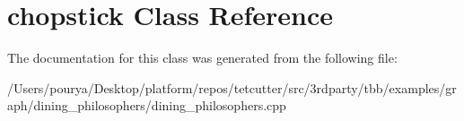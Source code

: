 \hypertarget{classchopstick}{}\section{chopstick Class Reference}
\label{classchopstick}


The documentation for this class was generated from the following file\+:\begin{DoxyCompactItemize}
\item 
/\+Users/pourya/\+Desktop/platform/repos/tetcutter/src/3rdparty/tbb/examples/graph/dining\+\_\+philosophers/dining\+\_\+philosophers.\+cpp\end{DoxyCompactItemize}
